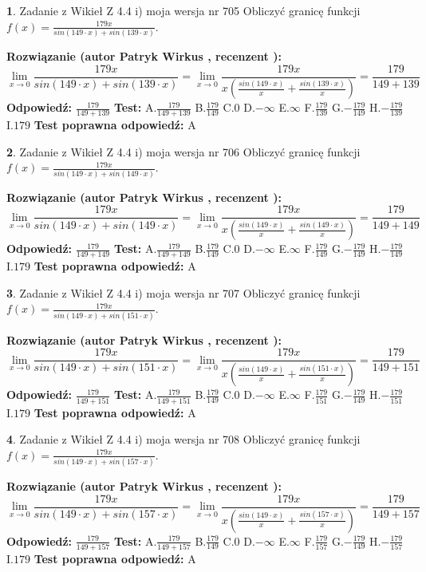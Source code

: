 \documentclass[12pt, a4paper]{article}
\theoremstyle{definition} %
\newtheorem{zad}{}
\newcommand{\zadStart}[1]{\begin{zad}#1\newline}
\newcommand{\zadStop}{\end{zad}}
\newcommand{\rozwStart}[2]{\noindent \textbf{Rozwiązanie (autor #1 , recenzent #2): }\newline}
\newcommand{\rozwStop}{\newline}
\newcommand{\odpStart}{\noindent \textbf{Odpowiedź:}\newline}
\newcommand{\odpStop}{\newline}
\newcommand{\testStart}{\noindent \textbf{Test:}\newline}
\newcommand{\testStop}{\newline}
\newcommand{\kluczStart}{\noindent \textbf{Test poprawna odpowiedź:}\newline}
\newcommand{\kluczStop}{\newline}
\begin{document}
\zadStart{Zadanie z Wikieł Z 4.4 i) moja wersja nr 705}
Obliczyć granicę funkcji $f(x)=\frac{179x}{sin(149\cdot x) +sin(139\cdot x)}$.
\zadStop
\rozwStart{Patryk Wirkus}{}
$$\lim\limits_{x\to 0}\frac{179x}{sin(149\cdot x) +sin(139\cdot x)}=\lim\limits_{x\to 0}\frac{179x}{x(\frac{sin(149\cdot x)}{x}+\frac{sin(139\cdot x)}{x})}=\frac{179}{149+139}$$
\rozwStop
\odpStart
$\frac{179}{149+139}$
\odpStop
\testStart
A.$\frac{179}{149+139}$
B.$\frac{179}{149}$
C.$0$
D.$-\infty$
E.$\infty$
F.$\frac{179}{139}$
G.$-\frac{179}{149}$
H.$-\frac{179}{139}$
I.$179$
\testStop
\kluczStart
A
\kluczStop



\zadStart{Zadanie z Wikieł Z 4.4 i) moja wersja nr 706}
Obliczyć granicę funkcji $f(x)=\frac{179x}{sin(149\cdot x) +sin(149\cdot x)}$.
\zadStop
\rozwStart{Patryk Wirkus}{}
$$\lim\limits_{x\to 0}\frac{179x}{sin(149\cdot x) +sin(149\cdot x)}=\lim\limits_{x\to 0}\frac{179x}{x(\frac{sin(149\cdot x)}{x}+\frac{sin(149\cdot x)}{x})}=\frac{179}{149+149}$$
\rozwStop
\odpStart
$\frac{179}{149+149}$
\odpStop
\testStart
A.$\frac{179}{149+149}$
B.$\frac{179}{149}$
C.$0$
D.$-\infty$
E.$\infty$
F.$\frac{179}{149}$
G.$-\frac{179}{149}$
H.$-\frac{179}{149}$
I.$179$
\testStop
\kluczStart
A
\kluczStop



\zadStart{Zadanie z Wikieł Z 4.4 i) moja wersja nr 707}
Obliczyć granicę funkcji $f(x)=\frac{179x}{sin(149\cdot x) +sin(151\cdot x)}$.
\zadStop
\rozwStart{Patryk Wirkus}{}
$$\lim\limits_{x\to 0}\frac{179x}{sin(149\cdot x) +sin(151\cdot x)}=\lim\limits_{x\to 0}\frac{179x}{x(\frac{sin(149\cdot x)}{x}+\frac{sin(151\cdot x)}{x})}=\frac{179}{149+151}$$
\rozwStop
\odpStart
$\frac{179}{149+151}$
\odpStop
\testStart
A.$\frac{179}{149+151}$
B.$\frac{179}{149}$
C.$0$
D.$-\infty$
E.$\infty$
F.$\frac{179}{151}$
G.$-\frac{179}{149}$
H.$-\frac{179}{151}$
I.$179$
\testStop
\kluczStart
A
\kluczStop



\zadStart{Zadanie z Wikieł Z 4.4 i) moja wersja nr 708}
Obliczyć granicę funkcji $f(x)=\frac{179x}{sin(149\cdot x) +sin(157\cdot x)}$.
\zadStop
\rozwStart{Patryk Wirkus}{}
$$\lim\limits_{x\to 0}\frac{179x}{sin(149\cdot x) +sin(157\cdot x)}=\lim\limits_{x\to 0}\frac{179x}{x(\frac{sin(149\cdot x)}{x}+\frac{sin(157\cdot x)}{x})}=\frac{179}{149+157}$$
\rozwStop
\odpStart
$\frac{179}{149+157}$
\odpStop
\testStart
A.$\frac{179}{149+157}$
B.$\frac{179}{149}$
C.$0$
D.$-\infty$
E.$\infty$
F.$\frac{179}{157}$
G.$-\frac{179}{149}$
H.$-\frac{179}{157}$
I.$179$
\testStop
\kluczStart
A
\kluczStop
\end{document}
